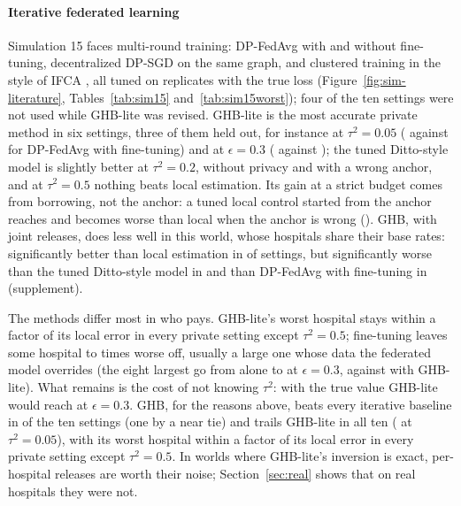 \paragraph{Iterative federated learning} Simulation 15 faces multi-round training: DP-FedAvg \cite{mcmahan2017communication,mcmahan2018learning} with and without fine-tuning, decentralized DP-SGD \cite{lian2017can} on the same graph, and clustered training in the style of IFCA \cite{ghosh2020efficient}, all tuned on \SimFifteenTune{} replicates with the true loss (Figure~\ref{fig:sim-literature}, Tables~\ref{tab:sim15} and~\ref{tab:sim15worst}); four of the ten settings were not used while GHB-lite was revised. GHB-lite is the most accurate private method in six settings, three of them held out, for instance at $\tau^2=0.05$ (\SimFifteenMidGHB{} against \SimFifteenMidFT{} for DP-FedAvg with fine-tuning) and at $\epsilon=0.3$ (\SimFifteenStrictGHB{} against \SimFifteenStrictFT); the tuned Ditto-style model is slightly better at $\tau^2=0.2$, without privacy and with a wrong anchor, and at $\tau^2=0.5$ nothing beats local estimation. Its gain at a strict budget comes from borrowing, not the anchor: a tuned local control started from the anchor reaches \SimFifteenStrictAnchorGD{} and becomes worse than local when the anchor is wrong (\SimFifteenAnchorAnchorGD). GHB, with joint releases, does less well in this world, whose hospitals share their base rates: significantly better than local estimation in \SimStSimLocBetter{} of \SimStSimLocN{} settings, but significantly worse than the tuned Ditto-style model in \SimStSimDittoWorse{} and than DP-FedAvg with fine-tuning in \SimStSimFTWorse{} (supplement).

The methods differ most in who pays. GHB-lite's worst hospital stays within a factor \SimFifteenGHBWorstMax{} of its local error in every private setting except $\tau^2=0.5$; fine-tuning leaves some hospital \SimFifteenFTWorstMin{} to \SimFifteenFTWorstMax{} times worse off, usually a large one whose data the federated model overrides (the eight largest go from \SimFifteenStrictLocalLarge{} alone to \SimFifteenStrictFTLarge{} at $\epsilon=0.3$, against \SimFifteenStrictGHBLarge{} with GHB-lite). What remains is the cost of not knowing $\tau^2$: with the true value GHB-lite would reach \SimFifteenStrictOracle{} at $\epsilon=0.3$. GHB, for the reasons above, beats every iterative baseline in \SimFifteenVBeatsIter{} of the ten settings (one by a near tie) and trails GHB-lite in all ten (\SimFifteenMidV{} at $\tau^2=0.05$), with its worst hospital within a factor \SimFifteenVWorstMax{} of its local error in every private setting except $\tau^2=0.5$. In worlds where GHB-lite's inversion is exact, per-hospital releases are worth their noise; Section~\ref{sec:real} shows that on real hospitals they were not.

